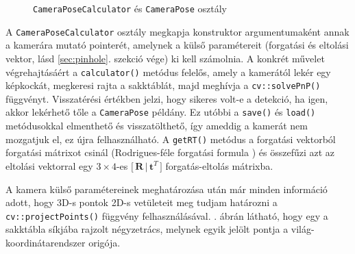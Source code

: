 \begin{figure}[tbh]
\centering


\caption{\texttt{CameraPoseCalculator} és \texttt{CameraPose} osztály \label{fig:cd:pose}}
\end{figure}

A \texttt{CameraPoseCalculator} osztály megkapja konstruktor argumentumaként annak a kamerára mutató pointerét, amelynek a külső paramétereit (forgatási és eltolási vektor, lásd \ref{sec:pinhole}. szekció vége) ki kell számolnia. A konkrét művelet végrehajtásáért a \texttt{calculator()} metódus felelős, amely a kamerától lekér egy képkockát, megkeresi rajta a sakktáblát, majd meghívja a \texttt{cv::solvePnP()} függvényt. Visszatérési értékben jelzi, hogy sikeres volt-e a detekció, ha igen, akkor lekérhető tőle a \texttt{CameraPose} példány. Ez utóbbi a \texttt{save()} és \texttt{load()} metódusokkal elmenthető és visszatölthető, így ameddig a kamerát nem mozgatjuk el, ez újra felhasználható. A \texttt{getRT()} metódus a forgatási vektorból forgatási mátrixot csinál (Rodrigues-féle forgatási formula \cite{opencv-rodrigues}) és összefűzi azt az eltolási vektorral egy $3\times 4$-es $\Big[\,\mathbf{R}\,|\,\mathbf{t}^T\,\Big]$ forgatás-eltolás mátrixba.

A kamera külső paramétereinek meghatározása után már minden információ adott, hogy 3D-s pontok 2D-s vetületeit meg tudjam határozni a \texttt{cv::projectPoints()} függvény felhasználásával. . ábrán látható, hogy egy a sakktábla síkjába rajzolt négyzetrács, melynek egyik jelölt pontja a világ-koordinátarendszer origója.

